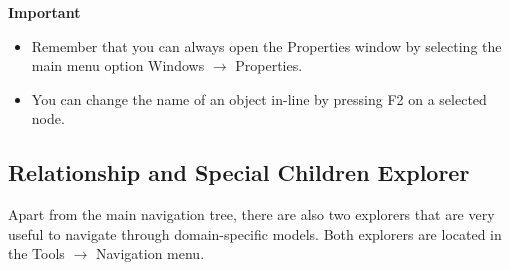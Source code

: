 \documentclass[a4paper]{article}
\begin{document}
	\begin{framed} {\large \textbf{Important}}
		\begin{itemize}
			\item Remember that you can always open the Properties window by selecting the main menu option Windows $\rightarrow$ Properties.
			\item You can change the name of an object in-line by pressing F2 on a selected node.
		\end{itemize}
	\end{framed}
	\subsection{Relationship and Special Children Explorer} \label{sec:extra_explorers}
	Apart from the main navigation tree, there are also two explorers that are very useful to navigate through domain-specific models. Both explorers are located in the Tools $\rightarrow$ Navigation menu.
\end{document}
